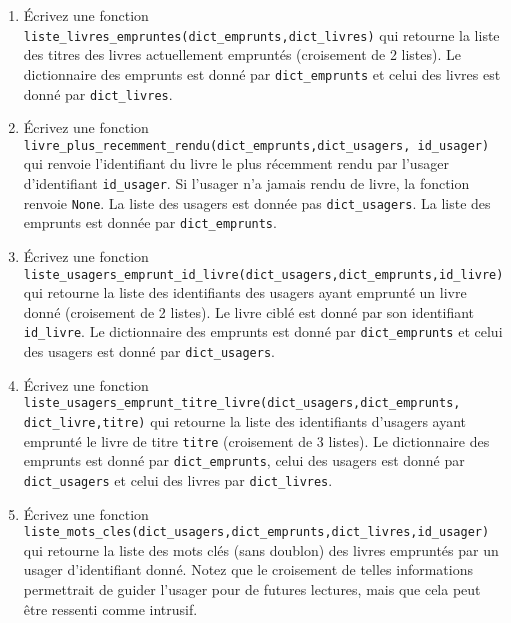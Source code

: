 \documentclass[10pt,a4paper]{sujets-exercices}
\begin{document}
\begin{enumerate}

\item Écrivez une fonction \texttt{liste\_livres\_empruntes(dict\_emprunts,dict\_livres)} qui retourne la liste des titres des livres actuellement empruntés (croisement de 2 listes). Le dictionnaire des emprunts est donné par \texttt{dict\_emprunts} et celui des livres est donné par \texttt{dict\_livres}.

\item Écrivez une fonction \texttt{livre\_plus\_recemment\_rendu(dict\_emprunts,dict\_usagers, id\_usager)} qui renvoie l'identifiant du livre le plus récemment rendu par l'usager d'identifiant \texttt{id\_usager}. Si l'usager n'a jamais rendu de livre, la fonction renvoie \texttt{None}. La liste des usagers est donnée pas \texttt{dict\_usagers}. La liste des emprunts est donnée par \texttt{dict\_emprunts}.

\item Écrivez une fonction \\ \texttt{liste\_usagers\_emprunt\_id\_livre(dict\_usagers,dict\_emprunts,id\_livre)} qui retourne la liste des identifiants des usagers ayant emprunté un livre donné (croisement de 2 listes). Le livre ciblé est donné par son identifiant \texttt{id\_livre}. Le dictionnaire des emprunts est donné par \texttt{dict\_emprunts} et celui des usagers est donné par \texttt{dict\_usagers}.

\item Écrivez une fonction \\ \texttt{liste\_usagers\_emprunt\_titre\_livre(dict\_usagers,dict\_emprunts,\\dict\_livre,titre)} qui retourne la liste des identifiants d'usagers ayant emprunté le livre de titre \texttt{titre} (croisement de 3 listes). Le dictionnaire des emprunts est donné par \texttt{dict\_emprunts}, celui des usagers est donné par \texttt{dict\_usagers} et celui des livres par \texttt{dict\_livres}.


\item Écrivez une fonction \\ \texttt{liste\_mots\_cles(dict\_usagers,dict\_emprunts,dict\_livres,id\_usager)} qui retourne la liste des mots clés (sans doublon) des livres empruntés par un usager d'identifiant donné. Notez que le croisement de telles informations permettrait de guider l'usager pour de futures lectures, mais que cela peut être ressenti comme intrusif.


\end{enumerate}
\end{document}

